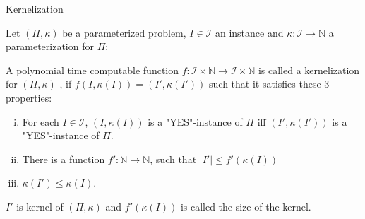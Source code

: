 \documentclass{beamer}
\begin{document}
\begin{frame}{Kernelization}

\begin{definition}
Let $(\Pi, \kappa)$ be a parameterized problem, $I\in\mathcal{I}$ an instance and $\kappa: \mathcal{I} \to \mathbb{N}$ a parameterization for $\Pi$:

A polynomial time computable function $f : \mathcal{I} \times \mathbb{N} \to \mathcal{I} \times \mathbb{N}$ is called a
\color{red} kernelization \color{black} for $(\Pi, \kappa)$ , if $f(I, \kappa(I)) = (I', \kappa(I'))$ such that it satisfies these 3 properties:

\begin{enumerate}[(i)]
\item For each $I \in \mathcal{I}$, $(I, \kappa(I))$ is a "YES"-instance of $\Pi$ iff $(I', \kappa(I'))$ is a "YES"-instance of $\Pi$.

\item There is a function $f': \mathbb{N} \to \mathbb{N}$, such that $|I'| \leq f'(\kappa(I))$

\item $\kappa(I')\leq \kappa(I)$.
\end{enumerate}

$I'$ is \color{red} kernel \color{black} of $(\Pi, \kappa)$ and $f'(\kappa(I))$ is called the size of the kernel.

\end{definition}

\end{frame}
\end{document}
